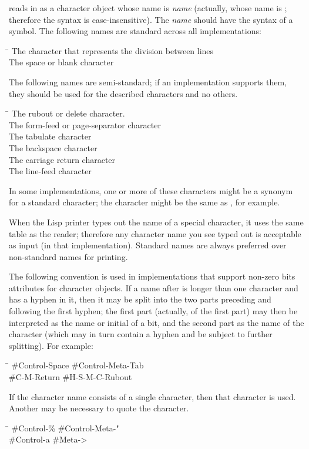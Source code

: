 \begin{flushdesc}
 reads in as a character object whose name is {\it name}
(actually, whose name is ;
therefore the syntax is case-insensitive).
The {\it name} should have the syntax of a symbol.
The following names are standard across all implementations:
\begin{tabbing}
\hskip 7pc\=\kill
{}\>The character that represents the division between lines \\
\>The space or blank character
\end{tabbing}
The following names are semi-standard; if an implementation supports
them, they should be used for the described characters and no others.
\begin{tabbing}
\hskip 7pc\=\kill
{}\>The rubout or delete character.\\
\>The form-feed or page-separator character \\
\>The tabulate character \\
\>The backspace character \\
\>The carriage return character \\
\>The line-feed character
\end{tabbing}
In some implementations, one or more of these characters might be
a synonym for a standard character; the  character
might be the same as , for example.

When the Lisp printer types out the name of a special character, it uses the
same table as the \cd{\#{\Xbackslash}} reader; therefore any character name you see typed out
is acceptable as input (in that implementation).  Standard names are always
preferred over non-standard names for printing.

The following convention is used in implementations that support
non-zero bits attributes for character objects.
If a name after \cd{\#{\Xbackslash}} is longer than one character and has a hyphen in it,
then it may be split into the two parts preceding
and following the first hyphen; the first part (actually, 
of the first part)
may then be interpreted as
the name or initial of a bit, and the second part as the name of the character
(which may in turn contain a hyphen and be subject to further splitting).
For example:
\begin{lisp}
\hskip10pc\=\kill
\#{\Xbackslash}Control-Space			\>\#{\Xbackslash}Control-Meta-Tab \\
\#{\Xbackslash}C-M-Return			\>\#{\Xbackslash}H-S-M-C-Rubout
\end{lisp}
If the character name consists of a single character, then that character
is used.  Another \cd{{\Xbackslash}} may be necessary to quote the character.
\begin{lisp}
\hskip10pc\=\kill
\#{\Xbackslash}Control-\%			\>\#{\Xbackslash}Control-Meta-{\Xbackslash}" \\
\#{\Xbackslash}Control-{\Xbackslash}a			\>\#{\Xbackslash}Meta->
\end{lisp}


\end{flushdesc}
